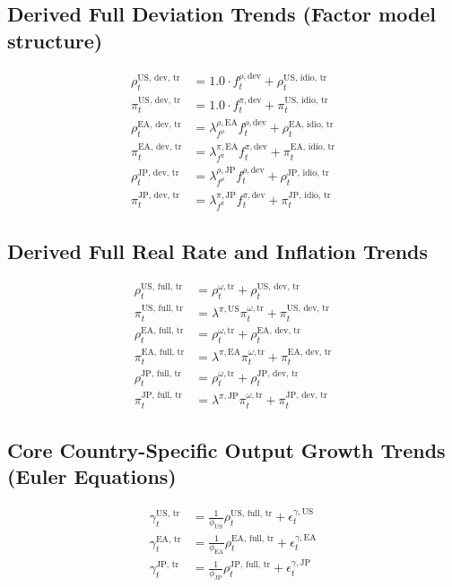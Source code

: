 \documentclass{article}
\begin{document}
\subsection*{Derived Full Deviation Trends (Factor model structure)}
\begin{align}
    \rho^{\text{US, dev, tr}}_t &= 1.0 \cdot f^{\rho, \text{dev}}_t + \rho^{\text{US, idio, tr}}_t \\
    \pi^{\text{US, dev, tr}}_t &= 1.0 \cdot f^{\pi, \text{dev}}_t + \pi^{\text{US, idio, tr}}_t \\
    \rho^{\text{EA, dev, tr}}_t &= \lambda^{\rho, \text{EA}}_{f^{\rho}} f^{\rho, \text{dev}}_t + \rho^{\text{EA, idio, tr}}_t \\
    \pi^{\text{EA, dev, tr}}_t &= \lambda^{\pi, \text{EA}}_{f^{\pi}} f^{\pi, \text{dev}}_t + \pi^{\text{EA, idio, tr}}_t \\
    \rho^{\text{JP, dev, tr}}_t &= \lambda^{\rho, \text{JP}}_{f^{\rho}} f^{\rho, \text{dev}}_t + \rho^{\text{JP, idio, tr}}_t \\
    \pi^{\text{JP, dev, tr}}_t &= \lambda^{\pi, \text{JP}}_{f^{\pi}} f^{\pi, \text{dev}}_t + \pi^{\text{JP, idio, tr}}_t
\end{align}

\subsection*{Derived Full Real Rate and Inflation Trends}
\begin{align}
    \rho^{\text{US, full, tr}}_t &= \rho^{\omega, \text{tr}}_t + \rho^{\text{US, dev, tr}}_t \\
    \pi^{\text{US, full, tr}}_t &= \lambda^{\pi, \text{US}} \pi^{\omega, \text{tr}}_t + \pi^{\text{US, dev, tr}}_t \\
    \rho^{\text{EA, full, tr}}_t &= \rho^{\omega, \text{tr}}_t + \rho^{\text{EA, dev, tr}}_t \\
    \pi^{\text{EA, full, tr}}_t &= \lambda^{\pi, \text{EA}} \pi^{\omega, \text{tr}}_t + \pi^{\text{EA, dev, tr}}_t \\
    \rho^{\text{JP, full, tr}}_t &= \rho^{\omega, \text{tr}}_t + \rho^{\text{JP, dev, tr}}_t \\
    \pi^{\text{JP, full, tr}}_t &= \lambda^{\pi, \text{JP}} \pi^{\omega, \text{tr}}_t + \pi^{\text{JP, dev, tr}}_t
\end{align}

\subsection*{Core Country-Specific Output Growth Trends (Euler Equations)}
\begin{align}
    \gamma^{\text{US, tr}}_t &= \frac{1}{\phi_{\text{US}}} \rho^{\text{US, full, tr}}_t + \epsilon^{\gamma, \text{US}}_t \\
    \gamma^{\text{EA, tr}}_t &= \frac{1}{\phi_{\text{EA}}} \rho^{\text{EA, full, tr}}_t + \epsilon^{\gamma, \text{EA}}_t \\
    \gamma^{\text{JP, tr}}_t &= \frac{1}{\phi_{\text{JP}}} \rho^{\text{JP, full, tr}}_t + \epsilon^{\gamma, \text{JP}}_t
\end{align}
\end{document}
